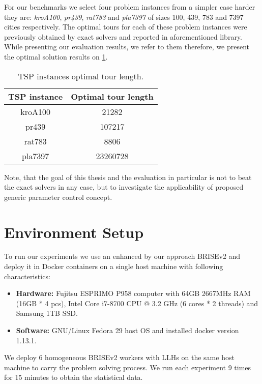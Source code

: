 For our benchmarks we select four problem instances from a simpler case harder they are: \emph{kroA100}, \emph{pr439}, \emph{rat783} and \emph{pla7397} of sizes 100, 439, 783 and 7397 cities respectively. The optimal tours for each of these problem instances were previously obtained by exact solvers and reported in aforementioned library. While presenting our evaluation results, we refer to them therefore, we present the optimal solution results on \cref{eval:table:tsp optimal tour length}.

\begin{table}[h!]
	\centering
	\begin{tabular}{c||c}
		\textbf{TSP instance} & \textbf{Optimal tour length} \\
		\hline
		\hline
		kroA100 & 21282 \\
		pr439 & 107217 \\
		rat783 & 8806 \\
		pla7397 & 23260728 \\
	\end{tabular}
	\caption{TSP instances optimal tour length.}
	\label{eval:table:tsp optimal tour length}
\end{table}

Note, that the goal of this thesis and the evaluation in particular is not to beat the exact solvers in any case, but to investigate the applicability of proposed generic parameter control concept.

\section{Environment Setup}\label{eval: environment}
To run our experiments we use an enhanced by our approach BRISEv2 and deploy it in Docker containers on a single host machine with following characteristics:
\begin{itemize}
	\item \textbf{Hardware:} Fujitsu ESPRIMO P958 computer with 64GB 2667MHz RAM (16GB * 4 pcs), Intel Core i7-8700 CPU @ 3.2 GHz (6 cores * 2 threads) and Samsung 1TB SSD.
	
	\item \textbf{Software:} GNU/Linux Fedora 29 host OS and installed docker version 1.13.1.
\end{itemize}

We deploy 6 homogeneous BRISEv2 workers with LLHs on the same host machine to carry the problem solving process.
We run each experiment 9 times for 15 minutes to obtain the statistical data.


